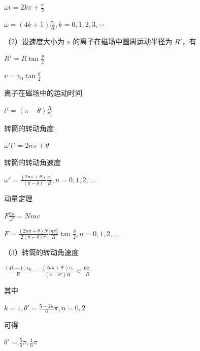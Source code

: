 \documentclass[\gkver]{gaokaozhenti}
\begin{document}
\begin{enumerate}
{	$\omega t=2k\pi+\frac{\pi}{2}$

	$\omega=(4k+1)\frac{v_{0}}{R},k=0,1,2,3,\cdots$

	（2）设速度大小为 $v$ 的离子在磁场中圆周运动半径为 $R'$，有

	$R' = R \tan \frac{\theta}{2}$

	$v = v_{0} \tan \frac{\theta}{2}$

	离子在磁场中的运动时间

	$t' = (\pi - \theta) \frac{R}{v_{0}}$

	转筒的转动角度

	$\omega't' = 2n\pi + \theta$

	转筒的转动角速度

	$\omega' = \frac{(2n\pi + \theta)}{(\pi - \theta)} \frac{v_{0}}{R}, n = 0, 1, 2, \ldots$

	动量定理

	$F \frac{2\pi}{\omega'} = Nm v$

	$F = \frac{(2n\pi + \theta)N}{2(\pi - \theta)\pi} \frac{mv_{0}^{2}}{R} \tan \frac{\theta}{2}, n = 0, 1, 2, \ldots$

	（3）转筒的转动角速度

	$\frac{(4k+1)v_{0}}{R}=\frac{\left(2n\pi+\theta'\right)v_{0}}{\left(\pi-\theta'\right)R}<\frac{6v_{0}}{R}$

	其中

	$k=1,\theta'=\frac{5-2n}{6}\pi,n=0,2$

	可得

	$\theta'=\frac{5}{6}\pi,\frac{1}{6}\pi$
}

\end{enumerate}
\end{document}
